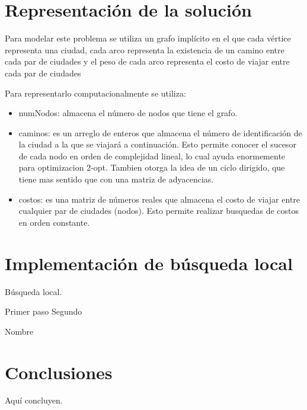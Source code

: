 \documentclass{ci5652}
\begin{document}
\section{Representación de la solución}
Para modelar este problema se utiliza un grafo implícito en el que cada vértice representa una ciudad, cada arco representa la existencia de un camino entre cada par de ciudades y el peso de cada arco representa el costo de viajar entre cada par de ciudades

Para representarlo computacionalmente se utiliza:
\begin{itemize}
\item numNodos: almacena el número de nodos que tiene el grafo.
\item caminos: es un arreglo de enteros que almacena el número de identificación de la ciudad a la que se viajará a continuación. Esto permite conocer el sucesor de cada nodo en orden de complejidad lineal, lo cual ayuda enormemente para optimizacion 2-opt.
Tambien otorga la idea de un ciclo dirigido, que tiene mas sentido que con una matriz de adyacencias.
\item costos: es una matriz de números reales que almacena el costo de viajar entre cualquier par de ciudades (nodos). Esto permite realizar busquedas de costos en orden constante.
\end{itemize}

\section{Implementación de búsqueda local}
Búsqueda local.

\begin{algorithm}
 \DontPrintSemicolon
 \vspace*{0.1cm}
 Primer paso\;
 Segundo\;
 \vspace*{0.1cm}
 \caption{Nombre}
\end{algorithm}

\section*{Conclusiones}

Aquí concluyen.


\small

\end{document}
